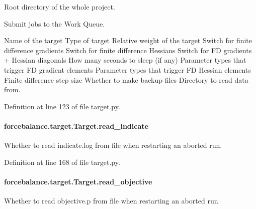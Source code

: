 Root directory of the whole project. 

Submit jobs to the Work Queue.

Name of the target Type of target Relative weight of the target Switch for finite difference gradients Switch for finite difference Hessians Switch for F\-D gradients + Hessian diagonals How many seconds to sleep (if any) Parameter types that trigger F\-D gradient elements Parameter types that trigger F\-D Hessian elements Finite difference step size Whether to make backup files Directory to read data from.

Definition at line 123 of file target.\-py.

\hypertarget{classforcebalance_1_1target_1_1Target_aa8af57d5be669c4bb1c0cfd4b7a9220e}{
\paragraph[{read\-\_\-indicate}]{\setlength{\rightskip}{0pt plus 5cm}forcebalance.\-target.\-Target.\-read\-\_\-indicate\hspace{0.3cm}{\ttfamily [inherited]}}}\label{classforcebalance_1_1target_1_1Target_aa8af57d5be669c4bb1c0cfd4b7a9220e}


Whether to read indicate.\-log from file when restarting an aborted run. 



Definition at line 168 of file target.\-py.

\hypertarget{classforcebalance_1_1target_1_1Target_a22bdc4bbce2020ae44b44ad3e444fda6}{
\paragraph[{read\-\_\-objective}]{\setlength{\rightskip}{0pt plus 5cm}forcebalance.\-target.\-Target.\-read\-\_\-objective\hspace{0.3cm}{\ttfamily [inherited]}}}\label{classforcebalance_1_1target_1_1Target_a22bdc4bbce2020ae44b44ad3e444fda6}


Whether to read objective.\-p from file when restarting an aborted run. 



